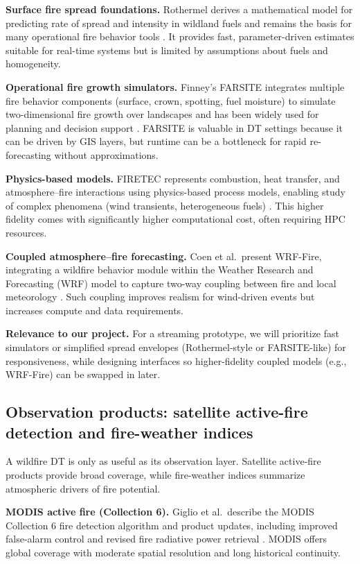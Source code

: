 \documentclass[acmsmall,screen,nonacm]{acmart}
\begin{document}
\textbf{Surface fire spread foundations.} Rothermel derives a mathematical model for predicting rate of spread and
intensity in wildland fuels and remains the basis for many operational fire behavior tools \cite{rothermel1972spread}.
It provides fast, parameter-driven estimates suitable for real-time systems but is limited by assumptions about
fuels and homogeneity.

\textbf{Operational fire growth simulators.} Finney's FARSITE integrates multiple fire behavior components
(surface, crown, spotting, fuel moisture) to simulate two-dimensional fire growth over landscapes and has been
widely used for planning and decision support \cite{finney1998farsite}. FARSITE is valuable in DT settings because
it can be driven by GIS layers, but runtime can be a bottleneck for rapid re-forecasting without approximations.

\textbf{Physics-based models.} FIRETEC represents combustion, heat transfer, and atmosphere--fire interactions
using physics-based process models, enabling study of complex phenomena (wind transients, heterogeneous fuels)
\cite{linn2002firetec}. This higher fidelity comes with significantly higher computational cost, often requiring HPC
resources.

\textbf{Coupled atmosphere--fire forecasting.} Coen et al.\ present WRF-Fire, integrating a wildfire behavior
module within the Weather Research and Forecasting (WRF) model to capture two-way coupling between fire and local
meteorology \cite{coen2013wrffire}. Such coupling improves realism for wind-driven events but increases compute and
data requirements.

\textbf{Relevance to our project.} For a streaming prototype, we will prioritize fast simulators or simplified
spread envelopes (Rothermel-style or FARSITE-like) for responsiveness, while designing interfaces so higher-fidelity
coupled models (e.g., WRF-Fire) can be swapped in later.

\subsection{Observation products: satellite active-fire detection and fire-weather indices}
A wildfire DT is only as useful as its observation layer. Satellite active-fire products provide broad coverage,
while fire-weather indices summarize atmospheric drivers of fire potential.

\textbf{MODIS active fire (Collection 6).} Giglio et al.\ describe the MODIS Collection 6 fire detection algorithm and
product updates, including improved false-alarm control and revised fire radiative power retrieval \cite{giglio2016modis}.
MODIS offers global coverage with moderate spatial resolution and long historical continuity.
\end{document}
